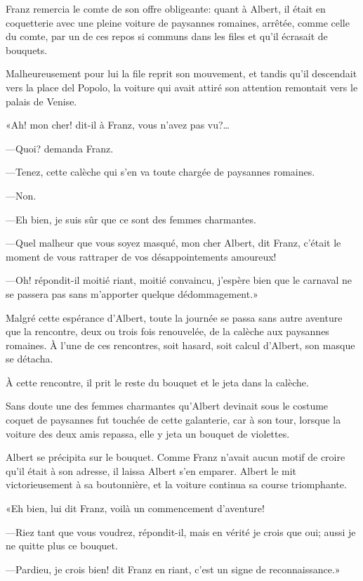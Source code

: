 Franz remercia le comte de son offre obligeante: quant à Albert, il était en coquetterie avec une pleine voiture de paysannes romaines, arrêtée, comme celle du comte, par un de ces repos si communs dans les files et qu'il écrasait de bouquets. 

Malheureusement pour lui la file reprit son mouvement, et tandis qu'il descendait vers la place del Popolo, la voiture qui avait attiré son attention remontait vers le palais de Venise. 

«Ah! mon cher! dit-il à Franz, vous n'avez pas vu?\dots 

—Quoi? demanda Franz. 

—Tenez, cette calèche qui s'en va toute chargée de paysannes romaines. 

—Non. 

—Eh bien, je suis sûr que ce sont des femmes charmantes. 

—Quel malheur que vous soyez masqué, mon cher Albert, dit Franz, c'était le moment de vous rattraper de vos désappointements amoureux! 

—Oh! répondit-il moitié riant, moitié convaincu, j'espère bien que le carnaval ne se passera pas sans m'apporter quelque dédommagement.» 

Malgré cette espérance d'Albert, toute la journée se passa sans autre aventure que la rencontre, deux ou trois fois renouvelée, de la calèche aux paysannes romaines. À l'une de ces rencontres, soit hasard, soit calcul d'Albert, son masque se détacha. 

À cette rencontre, il prit le reste du bouquet et le jeta dans la calèche. 

Sans doute une des femmes charmantes qu'Albert devinait sous le costume coquet de paysannes fut touchée de cette galanterie, car à son tour, lorsque la voiture des deux amis repassa, elle y jeta un bouquet de violettes. 

Albert se précipita sur le bouquet. Comme Franz n'avait aucun motif de croire qu'il était à son adresse, il laissa Albert s'en emparer. Albert le mit victorieusement à sa boutonnière, et la voiture continua sa course triomphante. 

«Eh bien, lui dit Franz, voilà un commencement d'aventure! 

—Riez tant que vous voudrez, répondit-il, mais en vérité je crois que oui; aussi je ne quitte plus ce bouquet. 

—Pardieu, je crois bien! dit Franz en riant, c'est un signe de reconnaissance.»  

